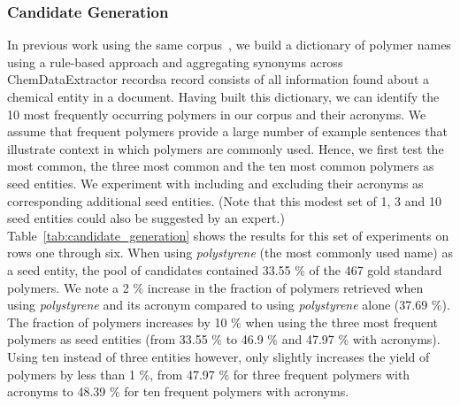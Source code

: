 \subsubsection{Candidate Generation}
In previous work using the same corpus~\cite{tchoua2016hybrid,tchoua2016hybridi}, we build a dictionary of polymer names using a rule-based approach and aggregating synonyms across ChemDataExtractor records\textemdash a record consists of all information found about a chemical entity in a document.  
Having built this dictionary, we can identify the 10 most frequently occurring polymers in our corpus and their acronyms.
We assume that frequent polymers provide a large number of example sentences that illustrate context in which polymers are commonly used.
Hence, we first test the most common, the three most common and the ten most common polymers as seed entities.
We experiment with including and excluding their acronyms as corresponding additional seed entities.
(Note that this modest set of 1, 3 and 10 seed entities could also be suggested by an expert.)
Table~\ref{tab:candidate_generation} shows the results for this set of experiments on rows one through six.
When using \textit{polystyrene} (the most commonly used name) as a seed entity, the pool of candidates contained 33.55 \% of the 467 gold standard polymers.
We note a 2 \% increase in the fraction of polymers retrieved when using \textit{polystyrene} and its acronym compared to using \textit{polystyrene} alone (37.69 \%).
The fraction of polymers increases by 10 \% when using the three most frequent polymers as seed entities (from 33.55 \% to 46.9 \% and 47.97 \% with acronyms). 
Using ten instead of three entities however, only slightly increases the yield of polymers by less than 1 \%, from 47.97 \% for three frequent polymers with acronyms to 48.39 \% for ten frequent polymers with acronyms.

